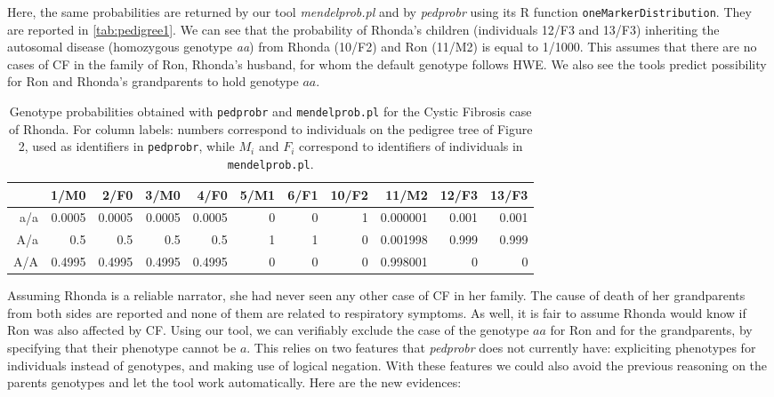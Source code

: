 \documentclass{eptcs}
\begin{document}
Here, the same probabilities are returned by our tool \textit{mendelprob.pl} and by \textit{pedprobr} using its R function \texttt{oneMarkerDistribution}. They are reported in \autoref{tab:pedigree1}. We can see that the probability of Rhonda's children (individuals 12/F3 and 13/F3) inheriting the autosomal disease (homozygous genotype \textit{aa}) from Rhonda (10/F2) and Ron (11/M2) is equal to 1/1000. This assumes that there are no cases of CF in the family of Ron, Rhonda's husband, for whom the default genotype follows HWE. We also see the tools predict possibility for Ron and Rhonda's grandparents to hold genotype $aa$.

\begin{table}[ht]
\centering
\caption{Genotype probabilities obtained with \texttt{pedprobr} and \texttt{mendelprob.pl} for the Cystic Fibrosis case of Rhonda. For column labels: numbers correspond to individuals on the pedigree tree of Figure 2, used as identifiers in \texttt{pedprobr}, while $M_i$ and $F_i$ correspond to identifiers of individuals in \texttt{mendelprob.pl}.}
\label{tab:pedigree1}
\centering
\footnotesize
\begin{tabular}{rrrrrrrrrrr}
  \toprule
 & 1/M0 & 2/F0 & 3/M0 & 4/F0 & 5/M1 & 6/F1 & 10/F2 & 11/M2 & 12/F3 & 13/F3 \\ 
  \hline
a/a &  0.0005 &  0.0005 &  0.0005 &  0.0005 & 0 & 0  & 1 &    0.000001 & 0.001 & 0.001 \\ 
  A/a &    0.5 &    0.5 &    0.5 &    0.5 & 1 & 1 & 0 & 0.001998 & 0.999 & 0.999 \\ 
  A/A & 0.4995 & 0.4995 & 0.4995 & 0.4995 & 0 & 0 & 0 & 0.998001 &     0 &     0 \\
  \bottomrule
\end{tabular}
\end{table}



Assuming Rhonda is a reliable narrator, she had never seen any other case of CF in her family. The cause of death of her grandparents from both sides are reported and none of them are related to respiratory symptoms. As well, it is fair to assume Rhonda would know if Ron was also affected by CF. Using our tool, we can verifiably exclude the case of the genotype $aa$ for Ron and for the grandparents, by specifying that their phenotype cannot be $a$. This relies on two features that \textit{pedprobr} does not currently have: expliciting phenotypes for individuals instead of genotypes, and making use of logical negation. With these features we could also avoid the previous reasoning on the parents genotypes and let the tool work automatically. Here are the new evidences:
\end{document}
